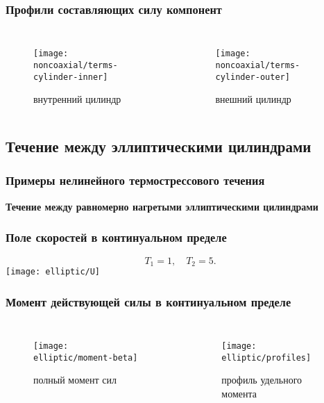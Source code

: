 \documentclass[mathserif]{beamer} %
\begin{document}
\begin{frame}
    \frametitle{Профили составляющих силу компонент}
    \begin{columns}
        \begin{figure}
            \texttt{[image: noncoaxial/terms-cylinder-inner]}
            \vspace{-.5cm}\caption{внутренний цилиндр}
        \end{figure}
        \begin{figure}
            \texttt{[image: noncoaxial/terms-cylinder-outer]}
            \vspace{-.5cm}\caption{внешний цилиндр}
        \end{figure}
    \end{columns}
\end{frame}

\subsection{Течение между эллиптическими цилиндрами}

\begin{frame}[c]
    \frametitle{Примеры нелинейного термострессового течения}
    \centering
    \Large\bf
    Течение между равномерно нагретыми эллиптическими цилиндрами
\end{frame}

\begin{frame}
    \frametitle{Поле скоростей в континуальном пределе}
    \[ T_1 = 1, \quad T_2 = 5.\]
    \centering
    \hspace{-1cm}
    \texttt{[image: elliptic/U]}
    \hspace{-1cm}
\end{frame}

\begin{frame}
    \frametitle{Момент действующей силы в континуальном пределе}
    \begin{columns}
        \begin{figure}
            \texttt{[image: elliptic/moment-beta]}
            \caption{полный момент сил}
        \end{figure}
        \begin{figure}
            \texttt{[image: elliptic/profiles]}
            \caption{профиль удельного момента}
        \end{figure}
    \end{columns}
\end{frame}
\end{document}
